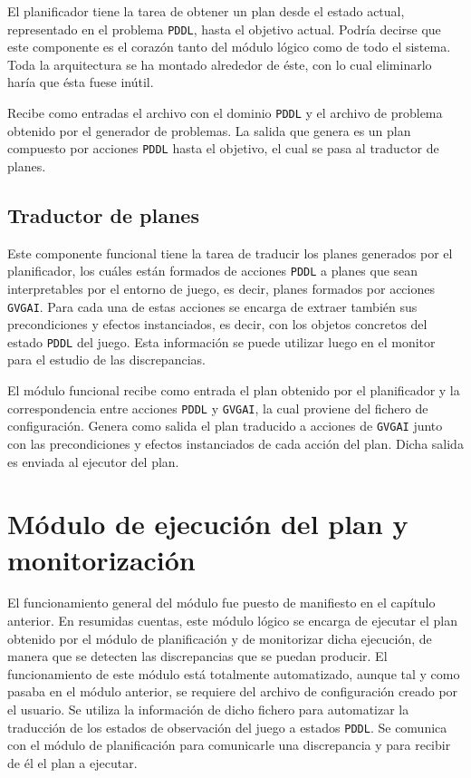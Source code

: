 El planificador tiene la tarea de obtener un plan desde el estado actual, representado en el problema
\texttt{PDDL}, hasta el objetivo actual. Podría decirse que este componente es el corazón tanto del módulo
lógico como de todo el sistema. Toda la arquitectura se ha montado alrededor de éste, con lo cual
eliminarlo haría que ésta fuese inútil.

Recibe como entradas el archivo con el dominio \texttt{PDDL} y el archivo de problema obtenido
por el generador de problemas. La salida que genera es un plan compuesto por acciones
\texttt{PDDL} hasta el objetivo, el cual se pasa al traductor de planes.

\subsection{Traductor de planes}
\label{sec:translate-plan}

Este componente funcional tiene la tarea de traducir los planes generados por el planificador,
los cuáles están formados de acciones \texttt{PDDL} a planes que sean interpretables por el entorno
de juego, es decir, planes formados por acciones \texttt{GVGAI}. Para cada una de estas acciones
se encarga de extraer también sus precondiciones y efectos instanciados, es decir, con los objetos
concretos del estado \texttt{PDDL} del juego. Esta información se puede utilizar luego en el monitor
para el estudio de las discrepancias.

El módulo funcional recibe como entrada el plan obtenido por el planificador y la correspondencia
entre acciones \texttt{PDDL} y \texttt{GVGAI}, la cual proviene del fichero de configuración. Genera
como salida el plan traducido a acciones de \texttt{GVGAI} junto con las precondiciones y efectos
instanciados de cada acción del plan. Dicha salida es enviada al ejecutor del plan.

\section{Módulo de ejecución del plan y monitorización}

El funcionamiento general del módulo fue puesto de manifiesto en el capítulo anterior. En resumidas
cuentas, este módulo lógico se encarga de ejecutar el plan obtenido por el módulo de planificación
y de monitorizar dicha ejecución, de manera que se detecten las discrepancias que se puedan producir.
El funcionamiento de este módulo está totalmente automatizado, aunque tal y como pasaba en el módulo
anterior, se requiere del archivo de configuración creado por el usuario. Se utiliza la información
de dicho fichero para automatizar la traducción de los estados de observación del juego a estados
\texttt{PDDL}. Se comunica con el módulo de planificación para comunicarle una discrepancia
y para recibir de él el plan a ejecutar.


